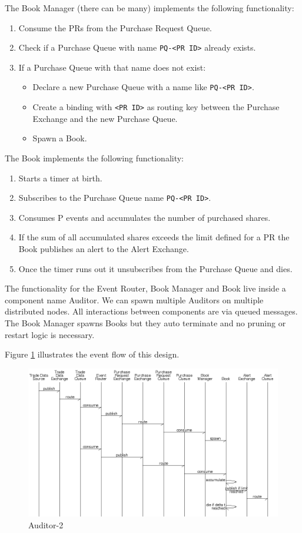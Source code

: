 \documentclass[captions=tableheading]{scrreprt}
\begin{document}
The Book Manager (there can be many) implements the following
functionality:
\begin{enumerate}
\item Consume the PRs from the Purchase Request Queue.
\item Check if a Purchase Queue with name \texttt{PQ-<PR ID>} already exists.
\item If a Purchase Queue with that name does not exist:
\begin{itemize}
\item Declare a new Purchase Queue with a name like \texttt{PQ-<PR ID>}.
\item Create a binding with \texttt{<PR ID>} as routing key between the
Purchase Exchange and the new Purchase Queue.
\item Spawn a Book.
\end{itemize}
\end{enumerate}

The Book implements the following functionality:
\begin{enumerate}
\item Starts a timer at birth.
\item Subscribes to the Purchase Queue name \texttt{PQ-<PR ID>}.
\item Consumes P events and accumulates the number of purchased shares.
\item If the sum of all accumulated shares exceeds the limit defined for
a PR the Book publishes an alert to the Alert Exchange.
\item Once the timer runs out it unsubscribes from the Purchase Queue and
dies.
\end{enumerate}

The functionality for the Event Router, Book Manager and Book live
inside a component name Auditor. We can spawn multiple Auditors on
multiple distributed nodes. All interactions between components are
via queued messages. The Book Manager spawns Books but they auto
terminate and no pruning or restart logic is necessary.

Figure \ref{fig:orgparagraph4} illustrates the event flow of this design.

\begin{figure}[htb]
\centering
\includegraphics[width=14 cm]{Auditor-2.png}
\caption{\label{fig:orgparagraph4}
Auditor-2}
\end{figure}
\end{document}

